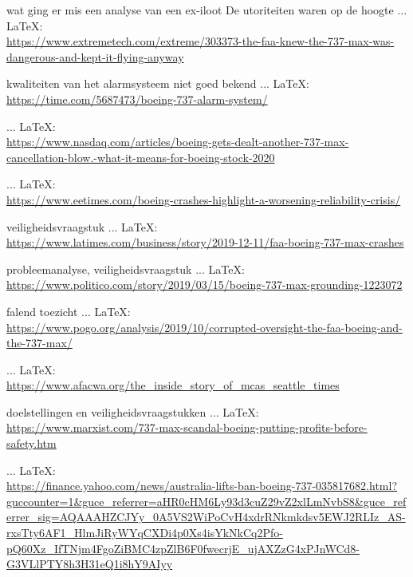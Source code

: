 \begin{thebibliography}{99}
{{{{{{{    wat ging er mis een analyse van een ex-iloot
    De utoriteiten waren op de hoogte
     ... \LaTeX:\\ \url{https://www.extremetech.com/extreme/303373-the-faa-knew-the-737-max-was-dangerous-and-kept-it-flying-anyway}
    
    kwaliteiten van het alarmsysteem niet goed bekend
     ... \LaTeX:\\ \url{https://time.com/5687473/boeing-737-alarm-system/}
    
     ... \LaTeX:\\ \url{https://www.nasdaq.com/articles/boeing-gets-dealt-another-737-max-cancellation-blow.-what-it-means-for-boeing-stock-2020}
    
     ... \LaTeX:\\ \url{https://www.eetimes.com/boeing-crashes-highlight-a-worsening-reliability-crisis/}
    
    veiligheidsvraagstuk
     ... \LaTeX:\\ \url{https://www.latimes.com/business/story/2019-12-11/faa-boeing-737-max-crashes}
    
    probleemanalyse, veiligheidsvraagstuk
     ... \LaTeX:\\ \url{https://www.politico.com/story/2019/03/15/boeing-737-max-grounding-1223072}
    
    falend toezicht
     ... \LaTeX:\\ \url{https://www.pogo.org/analysis/2019/10/corrupted-oversight-the-faa-boeing-and-the-737-max/}
    
     ... \LaTeX:\\ \url{https://www.afacwa.org/the_inside_story_of_mcas_seattle_times}
    
    doelstellingen en veiligheidsvraagstukken
     ... \LaTeX:\\ \url{https://www.marxist.com/737-max-scandal-boeing-putting-profits-before-safety.htm}
    
     ... \LaTeX:\\ \url{https://finance.yahoo.com/news/australia-lifts-ban-boeing-737-035817682.html?guccounter=1&guce_referrer=aHR0cHM6Ly93d3cuZ29vZ2xlLmNvbS8&guce_referrer_sig=AQAAAHZCJYy_0A5VS2WiPoCvH4xdrRNkmkdsv5EWJ2RLIz_AS-rxsTty6AF1_HlmJiRyWYqCXDi4p0Xs4isYkNkCq2Pfo-pQ60Xz_IfTNjm4FgoZiBMC4zpZlB6F0fwecrjE_ujAXZzG4xPJnWCd8-G3VLlPTY8h3H31eQ1i8hY9AIyy}
    
}}}}}}}
\end{thebibliography}
